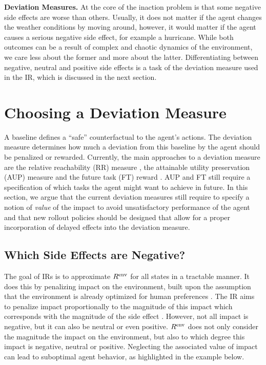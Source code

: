 \documentclass[letterpaper]{article} %
\newcommand{\Rframe}{R^{\textnormal{env}}}
\begin{document}
\textbf{Deviation Measures.} At the core of the inaction problem is that some negative side effects are worse than others. Usually, it does not matter if the agent changes the weather conditions by moving around, however, it would matter if the agent causes a serious negative side effect, for example a hurricane. While both outcomes can be a result of complex and chaotic dynamics of the environment, we care less about the former and more about the latter. Differentiating between negative, neutral and positive side effects is a task of the deviation measure used in the IR, which is discussed in the next section.

\section{Choosing a Deviation Measure}
\label{sec:distance_measure}
A baseline defines a ``safe'' counterfactual to the agent's actions. The deviation measure determines how much a deviation from this baseline by the agent should be penalized or rewarded. Currently, the main approaches to a deviation measure are the relative reachability (RR) measure \citep{krakovna2018penalizing}, the attainable utility preservation (AUP) measure \citep{turner2020conservative} and the future task (FT) reward \citep{krakovna2020avoiding}. AUP and FT still require a specification of which tasks the agent might want to achieve in future. In this section, we argue that the current deviation measures still require to specify a notion of \emph{value} of the impact to avoid unsatisfactory performance of the agent and that new rollout policies should be designed that allow for a proper incorporation of delayed effects into the deviation measure.

\subsection{Which Side Effects are Negative?}
The goal of IRs is to approximate $\Rframe$ for all states in a tractable manner. It does this by penalizing impact on the environment, built upon the assumption that the environment is already optimized for human preferences \citep{Shah2018}.
The IR aims to penalize impact proportionally to the magnitude of this impact which corresponds with the magnitude of the side effect \citep{krakovna2018penalizing, turner2020conservative}. However, not all impact is negative, but it can also be neutral or even positive. $\Rframe$ does not only consider the magnitude the impact on the environment, but also to which degree this impact is negative, neutral or positive. Neglecting the associated value of impact can lead to suboptimal agent behavior, as highlighted in the example below.
\end{document}
